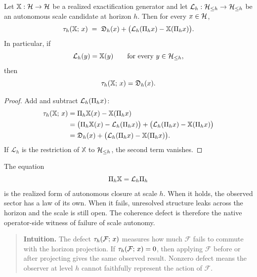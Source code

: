 \begin{proposition}
\label{prop:coherence-defect-and-autonomy-defect}
Let \(\mathbb X:\mathcal{H}\to\mathcal{H}\) be a realized exactification generator and let
\(\mathcal L_h:\mathcal{H}_{\le h}\to\mathcal{H}_{\le h}\) be an autonomous scale candidate at
horizon \(h\). Then for every \(x\in\mathcal{H}\),
\[
\tau_{h}(\mathbb X;\, x)
\;=\;
\mathfrak D_h(x)
+
\bigl(\mathcal L_h(\Pi_{h}x)-\mathbb X(\Pi_{h}x)\bigr).
\]
In particular, if
\[
\mathcal L_h(y)=\mathbb X(y)
\qquad
\text{for every }y\in\mathcal{H}_{\le h},
\]
then
\[
\tau_{h}(\mathbb X;\, x)=\mathfrak D_h(x).
\]
\end{proposition}

\begin{proof}
Add and subtract \(\mathcal L_h(\Pi_{h}x)\):
\begin{align*}
\tau_{h}(\mathbb X;\, x)
&=
\Pi_{h}\mathbb X(x)-\mathbb X(\Pi_{h}x)\\
&=
\bigl(\Pi_{h}\mathbb X(x)-\mathcal L_h(\Pi_{h}x)\bigr)
+
\bigl(\mathcal L_h(\Pi_{h}x)-\mathbb X(\Pi_{h}x)\bigr)\\
&=
\mathfrak D_h(x)
+
\bigl(\mathcal L_h(\Pi_{h}x)-\mathbb X(\Pi_{h}x)\bigr).
\end{align*}
If \(\mathcal L_h\) is the restriction of \(\mathbb X\) to \(\mathcal{H}_{\le h}\), the
second term vanishes.
\end{proof}

\begin{remark}
\label{rem:meaning-of-scale-autonomy-equation}
The equation
\[
\Pi_{h}\mathbb X = \mathcal L_h\Pi_{h}
\]
is the realized form of autonomous closure at scale \(h\). When it holds, the
observed sector has a law of its own. When it fails, unresolved structure leaks
across the horizon and the scale is still open. The coherence defect is
therefore the native operator-side witness of failure of scale autonomy.
\end{remark}

\begin{quote}\small
\textbf{Intuition.} The defect $\tau_{h}(\mathcal{F};\, x)$ measures how much $\mathcal{F}$ fails to commute with the horizon projection.
If $\tau_{h}(\mathcal{F};\, x) = 0$, then applying $\mathcal{F}$ before or after projecting gives the same observed result.
Nonzero defect means the observer at level $h$ cannot faithfully represent the action of $\mathcal{F}$.
\end{quote}


